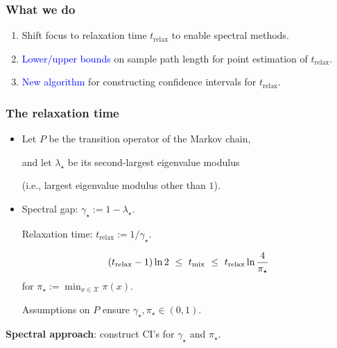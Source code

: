 \documentclass[11pt,compress,blue4]{beamer}
\newcommand{\GREEN}[1]{\textcolor{boldgreen}{#1}}
\newcommand{\BLUE}[1]{\textcolor{blue}{#1}}
\newcommand\fns\footnotesize
\newcommand\tmix{\ensuremath{t_{\operatorname{mix}}}}
\newcommand\trelax{\ensuremath{t_{\operatorname{relax}}}}
\newcommand\pimin{\ensuremath{\pi_{\star}}}
\newcommand\gap{\ensuremath{\gamma_{\star}}}
\newcommand\slem{\ensuremath{\lambda_{\star}}}
\newcommand\states{\ensuremath{\mathcal{X}}}
\begin{document}

\begin{frame}
  \frametitle{What we do}

  \begin{enumerate}
    \item
      Shift focus to \GREEN{relaxation time} $\trelax$ to enable
      spectral methods.

      \medskip

    \item
      \BLUE{Lower/upper bounds} on sample path length for point
      estimation of $\trelax$.

      \medskip

    \item
      \BLUE{New algorithm} for constructing confidence intervals for
      $\trelax$.

  \end{enumerate}

\end{frame}


\begin{frame}
  \frametitle{The relaxation time}

  \begin{itemize}
    \item
      Let $P$ be the \GREEN{transition operator} of the Markov chain,

      and let $\slem$ be its \GREEN{second-largest eigenvalue modulus}

      {\fns(i.e., largest eigenvalue modulus other than $1$)}.

      \medskip

    \item
      \GREEN{Spectral gap}: $\gap := 1-\slem$.

      \GREEN{Relaxation time}: $\trelax := 1/\gap$.

      \[
        \Parens{ \trelax - 1 } \ln 2
        \ \leq \
        \tmix
        \ \leq \
        \trelax \ln \frac4{\pimin}
      \]
      for $\pimin := \min_{x \in \states} \pi(x)$.

      \medskip
      Assumptions on $P$ ensure $\gap, \pimin \in (0,1)$.

  \end{itemize}

  \begin{center}
    \textbf{Spectral approach}: construct CI's for $\gap$ and $\pimin$.
  \end{center}

\end{frame}
\end{document}
